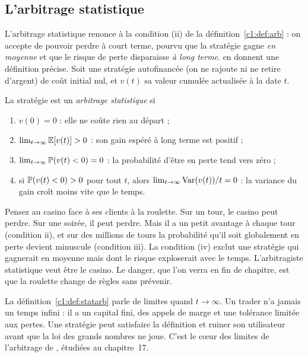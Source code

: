\subsection{L'arbitrage statistique}

L'arbitrage statistique renonce à la condition (ii) de la définition~\ref{c1:def:arb} : on accepte de pouvoir perdre à court terme, pourvu que la stratégie gagne \emph{en moyenne} et que le risque de perte disparaisse \emph{à long terme}. \citet{hogan2004} en donnent une définition précise. Soit une stratégie autofinancée (on ne rajoute ni ne retire d'argent) de coût initial nul, et $v(t)$ sa valeur cumulée actualisée à la date $t$.

\begin{definition}\label{c1:def:statarb}
La stratégie est un \emph{arbitrage statistique} si
\begin{enumerate}[label=(\roman*)]
\item $v(0) = 0$ : elle ne coûte rien au départ ;
\item $\lim_{t\to\infty}\mathbb{E}[v(t)] > 0$ : son gain espéré à long terme est positif ;
\item $\lim_{t\to\infty}\mathbb{P}(v(t) < 0) = 0$ : la probabilité d'être en perte tend vers zéro ;
\item si $\mathbb{P}(v(t)<0) > 0$ pour tout $t$, alors $\lim_{t\to\infty}\operatorname{Var}(v(t))/t = 0$ : la variance du gain croît moins vite que le temps.
\end{enumerate}
\end{definition}

\begin{intuition}
Pensez au casino face à ses clients à la roulette. Sur un tour, le casino peut perdre. Sur une soirée, il peut perdre. Mais il a un petit avantage à chaque tour (condition ii), et sur des millions de tours la probabilité qu'il soit globalement en perte devient minuscule (condition iii). La condition (iv) exclut une stratégie qui gagnerait en moyenne mais dont le risque exploserait avec le temps. L'arbitragiste statistique veut être le casino. Le danger, que l'on verra en fin de chapitre, est que la roulette change de règles sans prévenir.
\end{intuition}

\begin{pitfall}
La définition~\ref{c1:def:statarb} parle de limites quand $t\to\infty$. Un trader n'a jamais un temps infini : il a un capital fini, des appels de marge et une tolérance limitée aux pertes. Une stratégie peut satisfaire la définition et ruiner son utilisateur avant que la \og loi des grands nombres\fg{} ne joue. C'est le cœur des \og limites de l'arbitrage\fg{} de \citet{shleifer1997}, étudiées au chapitre~17.
\end{pitfall}

